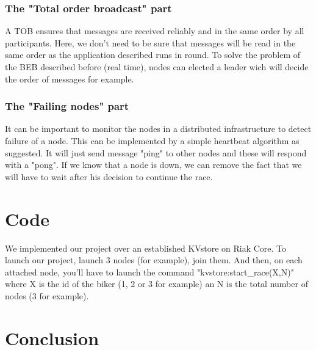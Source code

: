 \documentclass[a4paper, 11pt]{article}
\begin{document}
\subsubsection{The "Total order broadcast" part}
A TOB ensures that messages are received reliably and in the same order by all participants. Here, we don't need to be sure that messages will be read in the same order as the application described runs in round. To solve the problem of the BEB described before (real time), nodes can elected a leader wich will decide the order of messages for example.

\subsubsection{The "Failing nodes" part}
It can be important to monitor the nodes in a distributed infrastructure to detect failure of a node. This can be implemented by a simple heartbeat algorithm as suggested. It will just send message "ping" to other nodes and these will respond with a "pong". If we know that a node is down, we can remove the fact that we will have to wait after his decision to continue the race.

\section{Code}

We implemented our project over an established KVstore on Riak Core. To launch our project, launch 3 nodes (for example), join them. And then, on each attached node, you'll have to launch the command "kvstore:start_race(X,N)" where X is the id of the biker (1, 2 or 3 for example) an N is the total number of nodes (3 for example).  

\section{Conclusion}
\end{document}
